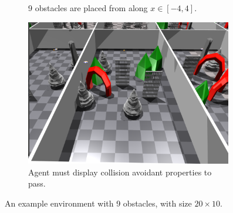 \begin{figure}[htb]
\begin{subfigure}[b]{0.26\textwidth}
        \caption{9 obstacles are placed from along $x \in [-4,4]$.}
        \label{fig:9_obst_png}
    \end{subfigure}
    \hfill
    \begin{subfigure}[b]{0.71\textwidth}
        \centering
        \captionsetup{justification=centering}
        \includegraphics[width=0.99\textwidth]{figures/7_/7_9_obst_flat.png}
        \caption{Agent must display collision avoidant properties to pass.}
        \label{fig:9_obst_flat_png}
    \end{subfigure} 
    \caption{An example environment with 9 obstacles, with size $20\times10$.}
    \label{fig:7_9_obst_and_flat_png}
\end{figure}

